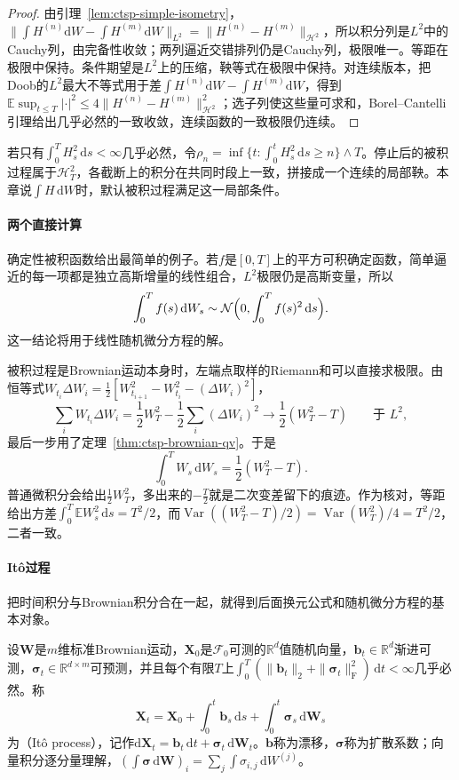 \begin{proof}
由引理~\ref{lem:ctsp-simple-isometry}，$\|\int H^{(n)}\mathrm dW-\int H^{(m)}\mathrm dW\|_{L^2}=\|H^{(n)}-H^{(m)}\|_{\mathcal H^2}$，所以积分列是$L^2$中的Cauchy列，由完备性收敛；两列逼近交错排列仍是Cauchy列，极限唯一。等距在极限中保持。条件期望是$L^2$上的压缩，鞅等式在极限中保持。对连续版本，把Doob的$L^2$最大不等式用于差$\int H^{(n)}\mathrm dW-\int H^{(m)}\mathrm dW$，得到$\mathbb E\sup_{t\leq T}|\cdot|^2\leq4\|H^{(n)}-H^{(m)}\|^2_{\mathcal H^2}$；选子列使这些量可求和，Borel--Cantelli引理给出几乎必然的一致收敛，连续函数的一致极限仍连续。
\end{proof}

若只有$\int_0^TH_s^2\,\mathrm ds<\infty$几乎必然，令$\rho_n=\inf\{t:\int_0^tH_s^2\,\mathrm ds\geq n\}\wedge T$。停止后的被积过程属于$\mathcal H^2_T$，各截断上的积分在共同时段上一致，拼接成一个连续的局部鞅。本章说$\int H\,\mathrm dW$时，默认被积过程满足这一局部条件。

\paragraph{两个直接计算}
确定性被积函数给出最简单的例子。若$f$是$[0,T]$上的平方可积确定函数，简单逼近的每一项都是独立高斯增量的线性组合，$L^2$极限仍是高斯变量，所以
\[
  \int_0^Tf(s)\,\mathrm dW_s\sim\mathcal N\Bigl(0,\int_0^Tf(s)^2\,\mathrm ds\Bigr).
\]
这一结论将用于线性随机微分方程的解。

被积过程是Brownian运动本身时，左端点取样的Riemann和可以直接求极限。由恒等式$W_{t_i}\Delta W_i=\frac12[W_{t_{i+1}}^2-W_{t_i}^2-(\Delta W_i)^2]$，
\[
  \sum_iW_{t_i}\Delta W_i=\frac12W_T^2-\frac12\sum_i(\Delta W_i)^2\longrightarrow\frac12(W_T^2-T)\qquad\text{于 }L^2,
\]
最后一步用了定理~\ref{thm:ctsp-brownian-qv}。于是
\begin{equation}
  \int_0^TW_s\,\mathrm dW_s=\frac12(W_T^2-T).
  \label{eq:ctsp-int-w-dw}
\end{equation}
普通微积分会给出$\frac12W_T^2$，多出来的$-\frac T2$就是二次变差留下的痕迹。作为核对，等距给出方差$\int_0^T\mathbb EW_s^2\,\mathrm ds=T^2/2$，而$\operatorname{Var}((W_T^2-T)/2)=\operatorname{Var}(W_T^2)/4=T^2/2$，二者一致。

\paragraph{Itô过程}
把时间积分与Brownian积分合在一起，就得到后面换元公式和随机微分方程的基本对象。

\begin{definition}[Itô过程]
  \label{def:ctsp-ito-process}
  设$\bm W$是$m$维标准Brownian运动，$\bm X_0$是$\mathcal F_0$可测的$\mathbb R^d$值随机向量，$\bm b_t\in\mathbb R^d$渐进可测，$\bm\sigma_t\in\mathbb R^{d\times m}$可预测，并且每个有限$T$上$\int_0^T(\|\bm b_t\|_2+\|\bm\sigma_t\|_{\mathrm F}^2)\,\mathrm dt<\infty$几乎必然。称
  \[
    \bm X_t=\bm X_0+\int_0^t\bm b_s\,\mathrm ds+\int_0^t\bm\sigma_s\,\mathrm d\bm W_s
  \]
  为（Itô process），记作$\mathrm d\bm X_t=\bm b_t\,\mathrm dt+\bm\sigma_t\,\mathrm d\bm W_t$。$\bm b$称为漂移，$\bm\sigma$称为扩散系数；向量积分逐分量理解，$(\int\bm\sigma\,\mathrm d\bm W)_i=\sum_j\int\sigma_{i,j}\,\mathrm dW^{(j)}$。
\end{definition}

